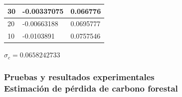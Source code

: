 \documentclass[xcolor=table]{beamer}
\begin{document}
\begin{frame}
{\begin{table}[H]
{\begin{tabular}{|l|l|l|}
																			30                & -0.00337075           & 0.066776                   \\ \hline
																			20                & -0.00663188           & 0.0695777                  \\ \hline
																			10                & -0.0103891            & 0.0757546                  \\ \hline
																		\end{tabular}}
																		\label{t:vcfNdvi}
																	\end{table}
																	$ \sigma_{c} = 0.0658242733 $
																}
															\end{frame}		
															
															\begin{frame}
																\frametitle{Pruebas y resultados experimentales\\Estimaci\'on de p\'erdida de carbono forestal}						
\end{frame}
\end{document}
